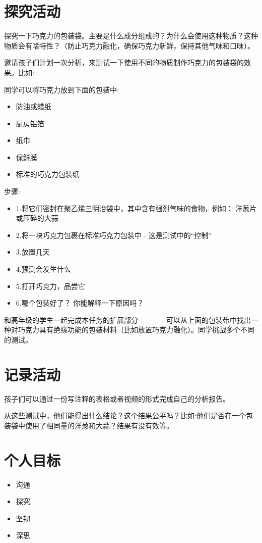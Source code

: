 \section{探究活动}
    探究一下巧克力的包装袋。主要是什么成分组成的？为什么会使用这种物质？这种物质会有啥特性？（防止巧克力融化，确保巧克力新鲜，保持其他气味和口味）。 \par
    邀请孩子们计划一次分析，来测试一下使用不同的物质制作巧克力的包装袋的效果。比如:\par
    同学可以将巧克力放到下面的包装中:  \par
    \begin{itemize}
      \item 防油或蜡纸
      \item 厨房铝箔
      \item 纸巾
      \item 保鲜膜
      \item 标准的巧克力包装纸
    \end{itemize}  
    步骤:\par
    \begin{itemize}
      \item 1.将它们密封在聚乙烯三明治袋中，其中含有强烈气味的食物，例如： 洋葱片或压碎的大蒜
      \item 2.将一块巧克力包裹在标准巧克力包装中 - 这是测试中的“控制”
      \item 3.放置几天
      \item 4.预测会发生什么
      \item 5.打开巧克力，品尝它 
      \item 6.哪个包装好了？ 你能解释一下原因吗？
    \end{itemize}  
    和高年级的学生一起完成本任务的扩展部分————可以从上面的包装带中找出一种对巧克力具有绝缘功能的包装材料（比如放置巧克力融化）。同学挑战多个不同的测试。


\section{记录活动}
   孩子们可以通过一份写注释的表格或者视频的形式完成自己的分析报告。\par
   从这些测试中，他们能得出什么结论？这个结果公平吗？比如:他们是否在一个包装袋中使用了相同量的洋葱和大蒜？结果有没有效等。


\section{个人目标}
 \begin{itemize}
   \item 沟通
   \item 探究
   \item 坚韧
   \item 深思
 \end{itemize} 
